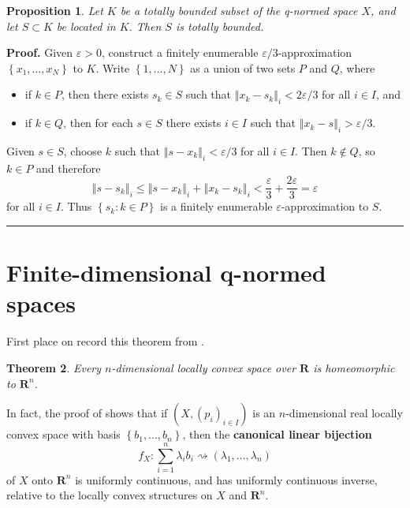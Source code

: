 \documentclass[11pt]{article}%
\newtheorem{theorem}{Theorem}
\newtheorem{proposition}[theorem]{Proposition}
\newenvironment{proof}[1][Proof]{\noindent\textbf{#1.} }{\ \rule{0.5em}{0.5em}}
\begin{document}
\begin{proposition}
\label{feb28p4}Let $K$ be a totally bounded subset of the q-normed space $X$,
and let $S\subset K$ be located in $K$. Then $S$ is totally bounded.
\end{proposition}

\begin{proof}
Given $\varepsilon>0$, construct a finitely enumerable $\varepsilon
/3$-approximation $\left\{  x_{1},\ldots,x_{N}\right\}  $ to $K$. Write
$\left\{  1,\ldots,N\right\}  $ as a union of two sets $P$ and $Q$, where

\begin{itemize}
\item[--] if $k\in P$, then there exists $s_{k}\in S$ such that $\left\Vert
x_{k}-s_{k}\right\Vert _{i}<2\varepsilon/3$ for all $i\in I$, and

\item[--] if $k\in Q$, then for each $s\in S$ there exists $i\in I$ such that
$\left\Vert x_{k}-s\right\Vert _{i}>\varepsilon/3$.
\end{itemize}

%

\noindent
Given $s\in S$, choose $k$ such that $\left\Vert s-x_{k}\right\Vert
_{i}<\varepsilon/3$ for all $i\in I$. Then $k\notin Q$, so $k\in P$ and
therefore%
\[
\left\Vert s-s_{k}\right\Vert _{i}\leq\left\Vert s-x_{k}\right\Vert
_{i}+\left\Vert x_{k}-s_{k}\right\Vert _{i}<\frac{\varepsilon}{3}%
+\frac{2\varepsilon}{3}=\varepsilon
\]
for all $i\in I$. Thus $\left\{  s_{k}:k\in P\right\}  $ is a finitely
enumerable $\varepsilon$-approximation to $S$.
\end{proof}

\section{Finite-dimensional q-normed spaces}

First place on record this theorem from \cite[Theorem 20.5]{OLG48}.

\begin{theorem}
\label{mar16t1}Every $n$-dimensional locally convex space over $\mathbf{R}$ is
homeomorphic to $\mathbf{R}^{n}$.
\end{theorem}

%

\noindent
In fact, the proof of \cite[Theorem 20.5]{OLG48} shows that if $\left(
X,\left(  p_{i}\right)  _{i\in I}\right)  $ is an $n$-dimensional real locally
convex space with basis $\left\{  b_{1},\ldots,b_{n}\right\}  $, then the
\textbf{canonical linear bijection}%
\begin{equation}
f_{X}:\sum_{i=1}^{n}\lambda_{i}b_{i}\rightsquigarrow\left(  \lambda_{1}%
,\ldots,\lambda_{n}\right)  \label{a12}%
\end{equation}
of $X$ onto $\mathbf{R}^{n}$ is uniformly continuous, and has uniformly
continuous inverse, relative to the locally convex structures on $X$ and
$\mathbf{R}^{n}$.\label{0000804}
\end{document}
